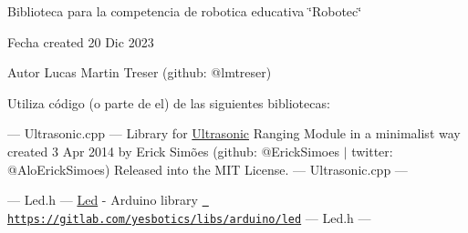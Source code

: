 Biblioteca para la competencia de robotica educativa \char`\"{}\+Robotec\char`\"{} \begin{DoxyDate}{Fecha}
created 20 Dic 2023 
\end{DoxyDate}
\begin{DoxyAuthor}{Autor}
Lucas Martin Treser (github\+: @lmtreser)
\end{DoxyAuthor}


Utiliza código (o parte de el) de las siguientes bibliotecas\+:

--- Ultrasonic.\+cpp --- Library for \mbox{\hyperlink{classUltrasonic}{Ultrasonic}} Ranging Module in a minimalist way created 3 Apr 2014 by Erick Simões (github\+: @\+Erick\+Simoes $\vert$ twitter\+: @\+Alo\+Erick\+Simoes) Released into the MIT License. --- Ultrasonic.\+cpp ---

--- Led.\+h --- \mbox{\hyperlink{classLed}{Led}} -\/ Arduino library \href{https://gitlab.com/yesbotics/libs/arduino/led}{\texttt{ https\+://gitlab.\+com/yesbotics/libs/arduino/led}} --- Led.\+h --- 